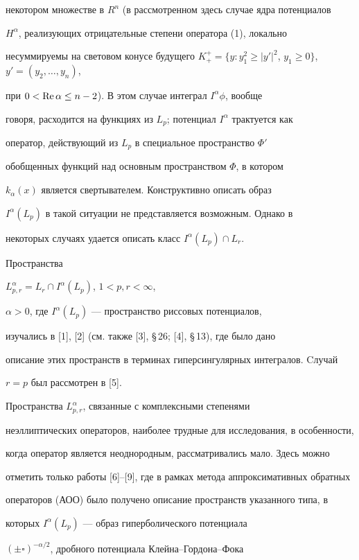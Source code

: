 некотором множестве в $R^n$ (в рассмотренном здесь случае ядра потенциалов


$H^\alpha$, реализующих отрицательные степени оператора (1), локально


несуммируемы на световом конусе будущего $K_+^+ = \{y: y_1^2 \geq


|y'|^2$, $y_1 \geq 0\}$, $y'=(y_2,\dotsc,y_n)$,


при $0<\operatorname{Re}\alpha\leq n-2$). В этом случае интеграл $I^\alpha\phi$, вообще


говоря, расходится на функциях из $L_p$; потенциал $I^\alpha$ трактуется как


оператор, действующий из $L_p$ в специальное пространство $\Phi'$


обобщенных функций над основным пространством $\Phi$, в котором


$k_\alpha(x)$ является свертывателем. Конструктивно описать образ


$I^\alpha(L_p)$  в такой ситуации не представляется возможным. Однако в


некоторых случаях удается описать класс $I^\alpha(L_p)\cap L_r$.





Пространства


$L_{p,r}^{\alpha} = L_r \cap I^{\alpha}(L_p)$, $1 < p,r < \infty$,


$\alpha > 0$, где $I^{\alpha}(L_p)$ --- пространство риссовых потенциалов,


изучались в [1], [2] (см. также [3], \S\,26; [4], \S\,13), где было дано


описание этих пространств в терминах гиперсингулярных интегралов. Cлучай


$r=p$ был рассмотрен в [5].


Пространства $L_{p,r}^\alpha$, связанные с комплексными степенями


неэллиптических операторов, наиболее трудные для исследования, в особенности,


когда оператор является неоднородным, рассматривались мало. Здесь можно


отметить только работы [6]--[9], где в рамках метода аппроксимативных обратных


операторов (АОО) было получено описание пространств указанного типа, в


которых $I^{\alpha}(L_p)$ --- образ гиперболического потенциала


${(\pm \square)}^{-\alpha/2}$, дробного потенциала Клейна--Гордона--Фока


